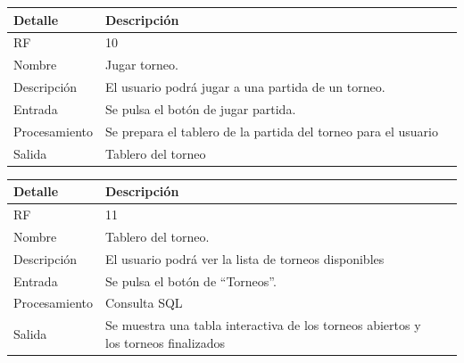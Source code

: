 \documentclass{article}
\begin{document}
\begin{table}[H]
  \begin{center}
    \begin{tabularx}{\linewidth}{|X|X|X|} %
      \hline
      \textbf{Detalle} & \textbf{Descripción}\\
      \hline
      RF & 10 \\
      \hline
      Nombre & Jugar torneo.\\
      \hline
      Descripción & El usuario podrá jugar a una partida de un torneo.\\
      \hline
      Entrada & Se pulsa el botón de jugar partida.\\
      \hline
      Procesamiento & Se prepara el tablero de la partida del torneo para el usuario\\
      Salida & Tablero del torneo\\
      \hline
    \end{tabularx}
  \end{center}
\end{table}

\begin{table}[h!]
  \begin{center}
    \begin{tabularx}{\linewidth}{|X|X|X|} %
      \hline
      \textbf{Detalle} & \textbf{Descripción}\\
      \hline
      RF & 11 \\
      \hline
      Nombre & Tablero del torneo.\\
      \hline
      Descripción & El usuario podrá ver la lista de torneos disponibles\\
      \hline
      Entrada & Se pulsa el botón de “Torneos”.\\
      \hline
      Procesamiento & Consulta SQL\\
      \hline
      Salida & Se muestra una tabla interactiva de los torneos abiertos y los torneos finalizados\\
      \hline
    \end{tabularx}
  \end{center}
\end{table}
\end{document}

